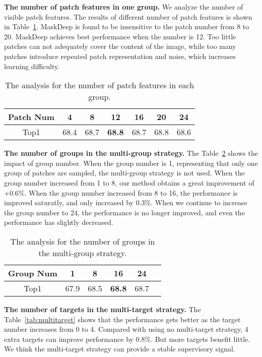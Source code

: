 \documentclass[10pt,twocolumn,letterpaper]{article}
\begin{document}
\noindent\textbf{The number of patch features in one group.} We analyze the number of visible patch features. The results of different number of patch features is shown in Table~\ref{tab:patch}. MaskDeep is found to be insensitive to the patch number from 8 to 20. MaskDeep achieves best performance when the number is 12. Too little patches can not adequately cover the content of the image, while too many patches introduce repeated patch representation and noise, which increases learning difficulty.

\begin{table}[h]
\centering
\caption{The analysis for the number of patch features in each group.}
\begin{tabular}{ccccccc}
\toprule
Patch Num  & 4 & 8  & 12 & 16   & 20 & 24 \\
\midrule 
Top1 & 68.4  & 68.7 & \textbf{68.8} & 68.7 & 68.8 & 68.6\\
\bottomrule
\end{tabular}
\label{tab:patch}
\end{table}


\noindent\textbf{The number of groups in the multi-group strategy.} The Table~\ref{tab:multigroup} shows the impact of group number. When the group number is 1, representing that only one group of patches are sampled, the multi-group strategy is not used. When the group number increased from 1 to 8, our method obtains a great improvement of +0.6\%. When the group number increased from 8 to 16, the performance is improved saturatly, and only increased by 0.3\%. When we continue to increase the group number to 24, the performance is no longer improved, and even the performance has slightly decreased. 

\begin{table}[h]
\centering
\caption{The analysis for the number of groups in the multi-group strategy.}
\begin{tabular}{cccccc}
\toprule
Group Num  & 1   & 8   & 16  & 24   \\
\midrule 
Top1 &  67.9  & 68.5 &  \textbf{68.8}    &  68.7 \\
\bottomrule
\end{tabular}

\label{tab:multigroup}
\end{table}

\noindent\textbf{The number of targets in the multi-target strategy.} The Table~\ref{tab:multitarget} shows that the performance gets better as the target number increases from 0 to 4. Compared with using no multi-target strategy, 4 extra targets can improve performance by 0.8\%. But more targets benefit little. We think the multi-target strategy can provide a stable supervisory signal.
\end{document}
